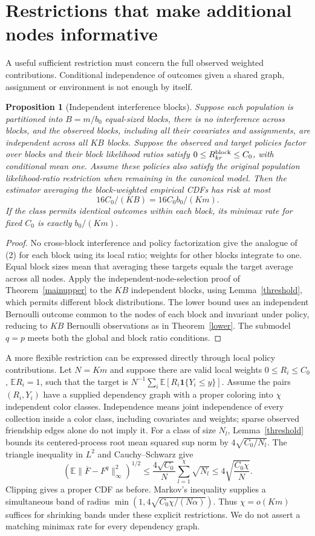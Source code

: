 \documentclass[11pt]{article}
\newtheorem{proposition}[theorem]{Proposition}
\theoremstyle{remark}\newtheorem{remark}[theorem]{Remark}
\newcommand{\E}{\mathbb E}
\newcommand{\Ind}{\mathbf 1}
\begin{document}
\section{Restrictions that make additional nodes informative}
A useful sufficient restriction must concern the full observed weighted contributions. Conditional independence of outcomes given a shared graph, assignment or environment is not enough by itself.

\begin{proposition}[Independent interference blocks]\label{blocks}
Suppose each population is partitioned into $B=m/b_0$ equal-sized blocks, there is no interference across blocks, and the observed blocks, including all their covariates and assignments, are independent across all $KB$ blocks. Suppose the observed and target policies factor over blocks and their block likelihood ratios satisfy $0\leq R_{kr}^{\rm block}\leq C_0$, with conditional mean one. Assume these policies also satisfy the original population likelihood-ratio restriction when remaining in the canonical model. Then the estimator averaging the block-weighted empirical CDFs has risk at most
\[
 16C_0/(KB)=16C_0b_0/(Km).
\]
If the class permits identical outcomes within each block, its minimax rate for fixed $C_0$ is exactly $b_0/(Km)$.
\end{proposition}
\begin{proof}
No cross-block interference and policy factorization give the analogue of (2) for each block using its local ratio; weights for other blocks integrate to one. Equal block sizes mean that averaging these targets equals the target average across all nodes. Apply the independent-node-selection proof of Theorem~\ref{mainupper} to the $KB$ independent blocks, using Lemma~\ref{threshold}, which permits different block distributions. The lower bound uses an independent Bernoulli outcome common to the nodes of each block and invariant under policy, reducing to $KB$ Bernoulli observations as in Theorem~\ref{lower}. The submodel $q=p$ meets both the global and block ratio conditions.
\end{proof}

A more flexible restriction can be expressed directly through local policy contributions. Let $N=Km$ and suppose there are valid local weights $0\leq R_i\leq C_0$, $\E R_i=1$, such that the target is
$N^{-1}\sum_i\E[R_i\Ind\{Y_i\leq y\}]$.
Assume the pairs $(R_i,Y_i)$ have a supplied dependency graph with a proper coloring into $\chi$ independent color classes. Independence means joint independence of every collection inside a color class, including covariates and weights; sparse observed friendship edges alone do not imply it.
For a class of size $N_l$, Lemma~\ref{threshold} bounds its centered-process root mean squared sup norm by $4\sqrt{C_0/N_l}$. The triangle inequality in $L^2$ and Cauchy--Schwarz give
\[
 \left(\E\|\overline F-F^q\|_\infty^2\right)^{1/2}
 \leq\frac{4\sqrt{C_0}}N\sum_{l=1}^\chi\sqrt{N_l}
 \leq4\sqrt{\frac{C_0\chi}{N}}.
\]
Clipping gives a proper CDF as before. Markov's inequality supplies a simultaneous band of radius
$\min(1,4\sqrt{C_0\chi/(N\alpha)})$. Thus $\chi=o(Km)$ suffices for shrinking bands under these explicit restrictions. We do not assert a matching minimax rate for every dependency graph.
\end{document}
